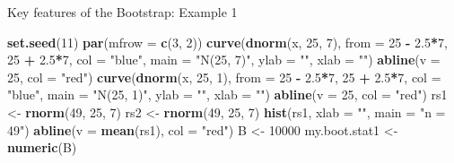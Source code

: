 \documentclass[
  ignorenonframetext,
]{beamer}
\newenvironment{Shaded}{\begin{snugshade}}{\end{snugshade}}
\newcommand{\AttributeTok}[1]{\textcolor[rgb]{0.13,0.29,0.53}{#1}}
\newcommand{\DecValTok}[1]{\textcolor[rgb]{0.00,0.00,0.81}{#1}}
\newcommand{\FloatTok}[1]{\textcolor[rgb]{0.00,0.00,0.81}{#1}}
\newcommand{\FunctionTok}[1]{\textcolor[rgb]{0.13,0.29,0.53}{\textbf{#1}}}
\newcommand{\NormalTok}[1]{#1}
\newcommand{\OtherTok}[1]{\textcolor[rgb]{0.56,0.35,0.01}{#1}}
\newcommand{\SpecialCharTok}[1]{\textcolor[rgb]{0.81,0.36,0.00}{\textbf{#1}}}
\newcommand{\StringTok}[1]{\textcolor[rgb]{0.31,0.60,0.02}{#1}}
\begin{document}
\begin{frame}[fragile]{Key features of the Bootstrap: Example 1}
\protect\hypertarget{key-features-of-the-bootstrap-example-1-1}{}
\tiny

\begin{Shaded}
\begin{Highlighting}[]
\FunctionTok{set.seed}\NormalTok{(}\DecValTok{11}\NormalTok{)}
\FunctionTok{par}\NormalTok{(}\AttributeTok{mfrow =} \FunctionTok{c}\NormalTok{(}\DecValTok{3}\NormalTok{, }\DecValTok{2}\NormalTok{))}
\FunctionTok{curve}\NormalTok{(}\FunctionTok{dnorm}\NormalTok{(x, }\DecValTok{25}\NormalTok{, }\DecValTok{7}\NormalTok{), }\AttributeTok{from =} \DecValTok{25} \SpecialCharTok{{-}} \FloatTok{2.5}\SpecialCharTok{*}\DecValTok{7}\NormalTok{, }\DecValTok{25} \SpecialCharTok{+} \FloatTok{2.5}\SpecialCharTok{*}\DecValTok{7}\NormalTok{, }\AttributeTok{col =} \StringTok{"blue"}\NormalTok{, }\AttributeTok{main =} \StringTok{"N(25, 7)"}\NormalTok{, }\AttributeTok{ylab =} \StringTok{""}\NormalTok{, }\AttributeTok{xlab =} \StringTok{""}\NormalTok{)}
\FunctionTok{abline}\NormalTok{(}\AttributeTok{v =} \DecValTok{25}\NormalTok{, }\AttributeTok{col =} \StringTok{"red"}\NormalTok{)}
\FunctionTok{curve}\NormalTok{(}\FunctionTok{dnorm}\NormalTok{(x, }\DecValTok{25}\NormalTok{, }\DecValTok{1}\NormalTok{), }\AttributeTok{from =} \DecValTok{25} \SpecialCharTok{{-}} \FloatTok{2.5}\SpecialCharTok{*}\DecValTok{7}\NormalTok{, }\DecValTok{25} \SpecialCharTok{+} \FloatTok{2.5}\SpecialCharTok{*}\DecValTok{7}\NormalTok{, }\AttributeTok{col =} \StringTok{"blue"}\NormalTok{, }\AttributeTok{main =} \StringTok{"N(25, 1)"}\NormalTok{, }\AttributeTok{ylab =} \StringTok{""}\NormalTok{, }\AttributeTok{xlab =} \StringTok{""}\NormalTok{)}
\FunctionTok{abline}\NormalTok{(}\AttributeTok{v =} \DecValTok{25}\NormalTok{, }\AttributeTok{col =} \StringTok{"red"}\NormalTok{)}
\NormalTok{rs1 }\OtherTok{\textless{}{-}} \FunctionTok{rnorm}\NormalTok{(}\DecValTok{49}\NormalTok{, }\DecValTok{25}\NormalTok{, }\DecValTok{7}\NormalTok{)}
\NormalTok{rs2 }\OtherTok{\textless{}{-}} \FunctionTok{rnorm}\NormalTok{(}\DecValTok{49}\NormalTok{, }\DecValTok{25}\NormalTok{, }\DecValTok{7}\NormalTok{)}
\FunctionTok{hist}\NormalTok{(rs1, }\AttributeTok{xlab =} \StringTok{""}\NormalTok{, }\AttributeTok{main =} \StringTok{"n = 49"}\NormalTok{)}
\FunctionTok{abline}\NormalTok{(}\AttributeTok{v =} \FunctionTok{mean}\NormalTok{(rs1), }\AttributeTok{col =} \StringTok{"red"}\NormalTok{)}
\NormalTok{B }\OtherTok{\textless{}{-}} \DecValTok{10000}
\NormalTok{my.boot.stat1 }\OtherTok{\textless{}{-}} \FunctionTok{numeric}\NormalTok{(B)}

\end{Highlighting}
\end{Shaded}
\end{frame}
\end{document}
